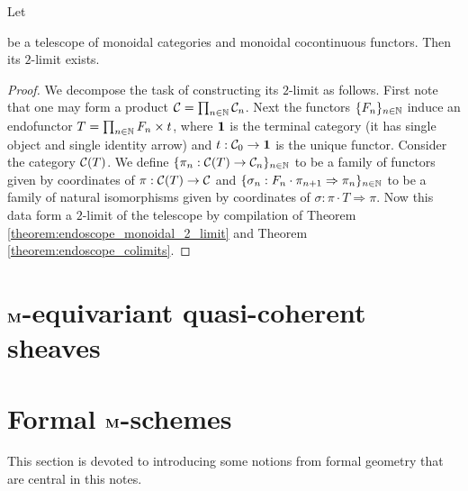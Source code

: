 \begin{corollary}\label{corollary:telescope_2_limits}
Let 
\begin{center}   
\end{center}
be a telescope of monoidal categories and monoidal cocontinuous functors. Then its $2$-limit exists.
\end{corollary}
\begin{proof}
We decompose the task of constructing its $2$-limit as follows. First note that one may form a product ${\mathcal C} = \prod_{n\in {\mathbb N}}{\mathcal C}_n$. Next the functors $\{F_n\}_{n\in {\mathbb N}}$ induce an endofunctor $T = \prod_{n\in {\mathbb N}}F_n\times t$, where $\mathbf{1}$ is the terminal category (it has single object and single identity arrow) and $t:{\mathcal C}_0\rightarrow \mathbf{1}$ is the unique functor. Consider the category ${\mathcal C}(T)$. We define $\{\pi_n:{\mathcal C}(T)\rightarrow {\mathcal C}_n\}_{n\in {\mathbb N}}$ to be a family of functors given by coordinates of $\pi:{\mathcal C}(T)\rightarrow {\mathcal C}$ and $\{\sigma_n:F_n\cdot \pi_{n+1}\Rightarrow \pi_n\}_{n\in {\mathbb N}}$ to be a family of natural isomorphisms given by coordinates of $\sigma:\pi\cdot T\Rightarrow \pi$. Now this data form a $2$-limit of the telescope by compilation of Theorem \ref{theorem:endoscope_monoidal_2_limit} and Theorem \ref{theorem:endoscope_colimits}.
\end{proof}

\section{$\mathbf{M}$-equivariant quasi-coherent sheaves}


\section{Formal $\mathbf{M}$-schemes}
\noindent
This section is devoted to introducing some notions from formal geometry that are central in this notes. 

